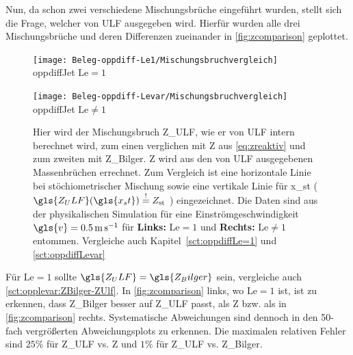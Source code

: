 Nun, da schon zwei verschiedene Mischungsbrüche eingeführt wurden, stellt sich die Frage, welcher von \gls{ULF} ausgegeben wird. Hierfür wurden alle drei Mischungsbrüche und deren Differenzen zueinander in \autoref{fig:zcomparison} geplottet.

\begin{figure}[H]
    \begin{center}\begin{minipage}{0.5\linewidth}\begin{center}
        \texttt{[image: Beleg-oppdiff-Le1/Mischungsbruchvergleich]}
        \\oppdiffJet $\mathrm{Le}=1$
    \end{center}\end{minipage}\begin{minipage}{0.5\linewidth}\begin{center}
        \texttt{[image: Beleg-oppdiff-Levar/Mischungsbruchvergleich]}
        \\oppdiffJet $\mathrm{Le}\neq 1$
    \end{center}\end{minipage}\end{center}
    \caption{Hier wird der Mischungsbruch \gls{Z_ULF}, wie er von \gls{ULF} intern berechnet wird, zum einen verglichen mit \gls{Z} aus \autoref{eq:zreaktiv} und zum zweiten mit \gls{Z_Bilger}. \gls{Z} wird aus den von \gls{ULF} ausgegebenen Massenbrüchen errechnet. Zum Vergleich ist eine horizontale Linie bei stöchiometrischer Mischung sowie eine vertikale Linie für \gls{x_st} ( $\gls{Z_ULF}( \gls{x_st} ) \overset{!}{=} Z_\mathrm{st}$ ) eingezeichnet.
    Die Daten sind aus der physikalischen Simulation für eine Einströmgeschwindigkeit $\gls{v}=\SI{0.5}{\meter\per\second}$ für
    \textbf{Links:} $\mathrm{Le}=1$ und
    \textbf{Rechts:} $\mathrm{Le}\neq 1$ entommen.
    Vergleiche auch Kapitel~\ref{sct:oppdiffLe=1} und \ref{sct:oppdiffLevar}}
    \label{fig:zcomparison}
\end{figure}

Für $\mathrm{Le}=1$ sollte $\gls{Z_ULF} = \gls{Z_Bilger}$ sein, vergleiche auch \autoref{sct:opplevar:ZBilger-ZUlf}. In \autoref{fig:zcomparison} links, wo $\mathrm{Le}=1$ ist, ist zu erkennen, dass \gls{Z_Bilger} besser auf \gls{Z_ULF} passt, als \gls{Z} bzw. als in \autoref{fig:zcomparison} rechts. Systematische Abweichungen sind dennoch in den 50-fach vergrößerten Abweichungsplots zu erkennen. Die maximalen relativen Fehler sind $25\%$ für \gls{Z_ULF} vs. \gls{Z} und $1\%$ für \gls{Z_ULF} vs. \gls{Z_Bilger}.

